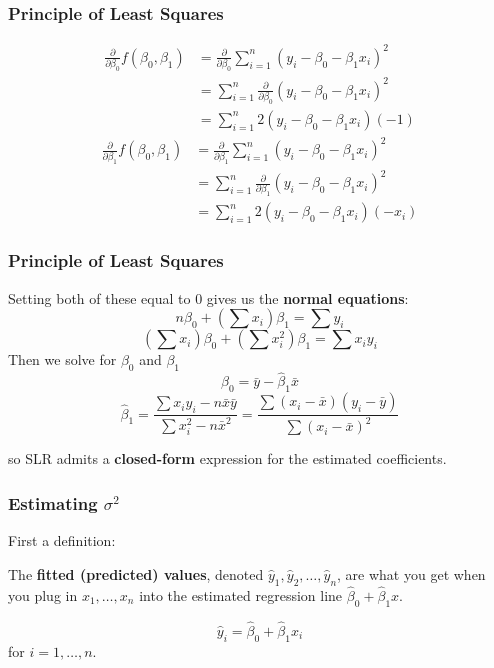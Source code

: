 \documentclass{beamer}
\begin{document}
\begin{frame}
\frametitle{Principle of Least Squares}

\begin{align*}
\frac{\partial}{\partial \beta_0} f(\beta_0, \beta_1) &= \frac{\partial}{\partial \beta_0}\sum_{i=1}^n ( y_i - \beta_0 - \beta_1 x_i)^2 \\
&= \sum_{i=1}^n \frac{\partial}{\partial \beta_0}( y_i - \beta_0 - \beta_1 x_i)^2 \\
&= \sum_{i=1}^n 2 ( y_i - \beta_0 - \beta_1 x_i) (-1)
\end{align*}
\begin{align*}
\frac{\partial}{\partial \beta_1} f(\beta_0, \beta_1) &= \frac{\partial}{\partial \beta_1}\sum_{i=1}^n ( y_i - \beta_0 - \beta_1 x_i)^2 \\
&= \sum_{i=1}^n \frac{\partial}{\partial \beta_1}( y_i - \beta_0 - \beta_1 x_i)^2 \\
&= \sum_{i=1}^n 2 ( y_i - \beta_0 - \beta_1 x_i) (-x_i)
\end{align*}

\end{frame}
\begin{frame}
\frametitle{Principle of Least Squares}

Setting both of these equal to $0$ gives us the \textbf{normal equations}:
\[
n\beta_0 + \left(\sum x_i \right)\beta_1 = \sum y_i
\]
\[
\left(\sum x_i \right)\beta_0 + \left(\sum x_i^2 \right) \beta_1 = \sum x_i y_i
\]
Then we solve for $\beta_0$ and $\beta_1$
\[
\hat{\beta}_0 = \bar{y} - \hat{\beta}_1 \bar{x}
\]
\[
\hat{\beta}_1 = \frac{\sum x_i y_i - n \bar{x}\bar{y}}{\sum x_i^2 - n\bar{x}^2} = \frac{\sum(x_i - \bar{x})(y_i - \bar{y})}{\sum (x_i - \bar{x})^2}
\]

so SLR admits a {\bf closed-form} expression for the estimated coefficients.
\end{frame}
\begin{frame}
\frametitle{Estimating $\sigma^2$}

First a definition:
\newline

The \textbf{fitted (predicted) values}, denoted $\hat{y}_1, \hat{y}_2, \ldots, \hat{y}_n$, are what you get when you plug in $x_1, \ldots, x_n$ into the estimated regression line $\hat{\beta}_0 + \hat{\beta}_1x$.
\newline

\[
\hat{y}_i = \hat{\beta}_0 + \hat{\beta}_1 x_i
\]
for $i = 1, \ldots, n$.

\end{frame}
\end{document}
